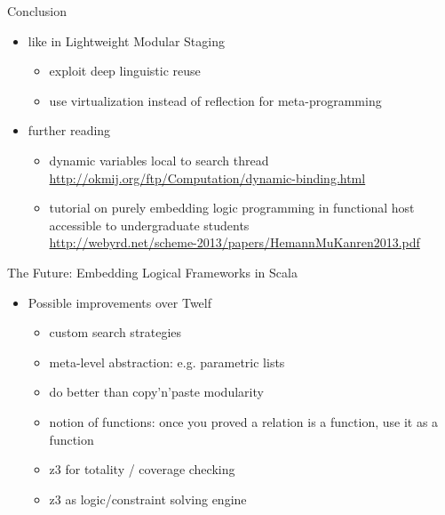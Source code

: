 \documentclass{beamer}
\begin{document}
\begin{frame}[fragile]{Conclusion}
\begin{itemize}
\item like in Lightweight Modular Staging
\begin{itemize}
\item exploit deep linguistic reuse
\item use virtualization instead of reflection for meta-programming
\end{itemize}
\item further reading
\begin{itemize}
\item dynamic variables local to search thread\\
{\tiny\url{http://okmij.org/ftp/Computation/dynamic-binding.html}}
\item tutorial on purely embedding logic programming in functional host\\
accessible to undergraduate students\\
{\tiny\url{http://webyrd.net/scheme-2013/papers/HemannMuKanren2013.pdf}}
\end{itemize}
\end{itemize}
\end{frame}

\begin{frame}[fragile]{The Future: Embedding Logical Frameworks in Scala}
\begin{itemize}
\item Possible improvements over Twelf
\begin{itemize}
\item custom search strategies
\item meta-level abstraction: e.g. parametric lists
\item do better than copy'n'paste modularity
\item notion of functions: once you proved a relation is a function, use it as a function
\item z3 for totality / coverage checking
\item z3 as logic/constraint solving engine
\end{itemize}
\end{itemize}
\end{frame}
\end{document}
